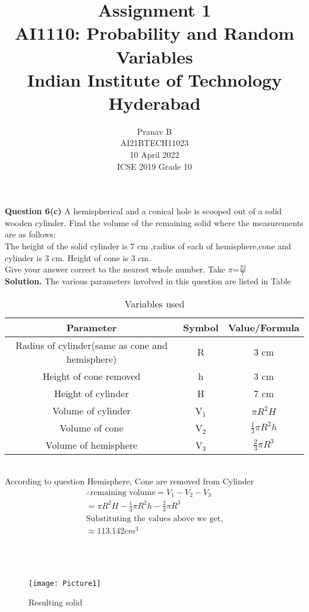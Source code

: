 \documentclass[journal,12pt,twocolumn]{IEEEtran}
\title{Assignment 1 \\ \Large AI1110: Probability and Random Variables \\ \large Indian Institute of Technology Hyderabad}
\author{Pranav B \\ \normalsize AI21BTECH11023 \\ \vspace*{20pt} \normalsize  10 April 2022 \\ \vspace*{20pt} \Large ICSE 2019 Grade 10}
\begin{document}
	\maketitle
	
	\textbf{Question 6(c)} 
	A hemispherical and a conical hole is scooped out of a solid wooden cylinder. Find the volume of the remaining solid where the measurements are as follows:\\
	The height of the solid cylinder is 7 cm ,radius of each of hemisphere,cone and cylinder is 3 cm. Height of cone is 3 cm.\\
	Give your answer correct to the nearest whole number. Take $\pi$=$\frac{22}{7}$\\
	\textbf{Solution.}
	The various parameters involved in this question are listed in Table\\ \begin{table}[h]
\caption{Variables used}
\begin{tabular}{|c |c|c|}
\hline 
\textbf{Parameter} & \textbf{Symbol} & \textbf{Value/Formula}\\
\hline
Radius of cylinder(same as cone and hemisphere) & R & 3 cm\\
\hline
Height of cone removed & h & 3 cm\\
\hline
Height of cylinder & H & 7 cm\\
\hline
Volume of cylinder & V$_1$ & $\pi R^2 H$\\
\hline
Volume of cone  & V$_2$ & $\frac{1}{3} \pi R^2 h$\\
\hline
Volume of hemisphere & V$_3$ & $\frac{2}{3} \pi R^3$\\
\hline
\end{tabular}
\end{table}
\\
According to question Hemisphere, Cone are removed from Cylinder\\
\begin{align}
\therefore \text{remaining volume} = V_1-V_2-V_3
\\
=\pi R^2 H - \frac{1}{3} \pi R^2 h - \frac{2}{3} \pi R^3
\\
\text{Substituting the values above  we get,}
\nonumber
\\
\approx113.142 cm^3
\nonumber
\end{align}
\\
\\
\\
\begin{figure}
\centering
\texttt{[image: Picture1]}
\caption{Resulting solid}
\label{fig:my_label}
\end{figure}
\end{document}
